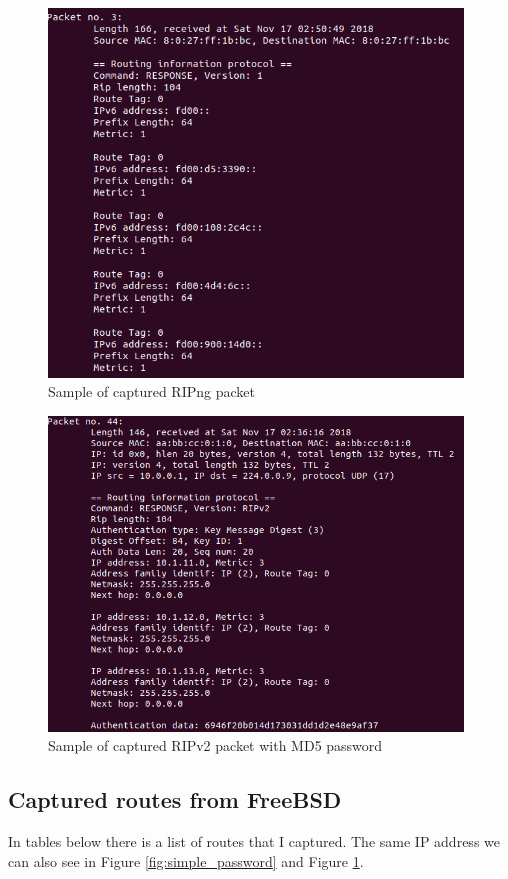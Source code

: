 \documentclass[11pt,a4paper]{article}
\begin{document}
\begin{figure}[H]
	
	\includegraphics[width=11cm]{img/sniffer_ripng.png} 
	\caption{Sample of captured RIPng packet}
	\label{fig:ripng}

\end{figure}

\begin{figure}[H]
	
	\includegraphics[width=11cm]{img/md5.png} 
	\caption{Sample of captured RIPv2 packet with MD5 password}
	\label{fig:md5}

\end{figure}     

\subsection{Captured routes from FreeBSD}
In tables below there is a list of routes that I captured. The same IP address we can also see in Figure \ref{fig:simple_password} and Figure \ref{fig:ripng}.\\
\end{document}
